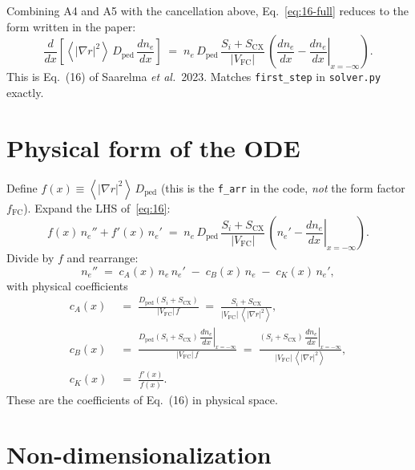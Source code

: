 \documentclass[11pt]{article}
\renewcommand{\ne}{n_{e}}  %
\newcommand{\Vfc}{\lvert V_{\mathrm{FC}}\rvert}
\newcommand{\Si}{S_{i}}
\newcommand{\Scx}{S_{\mathrm{CX}}}
\newcommand{\Dped}{D_{\mathrm{ped}}}
\newcommand{\fFC}{f_{\mathrm{FC}}}
\newcommand{\fsa}[1]{\left\langle #1 \right\rangle}
\newcommand{\gradrsq}{\fsa{|\nabla r|^{2}}}
\newcommand{\neginf}{x=-\infty}
\newcommand{\dneneg}{\left.\dfrac{d\ne}{dx}\right|_{\neginf}}
\begin{document}
Combining A4 and A5 with the cancellation above, Eq.~\eqref{eq:16-full}
reduces to the form written in the paper:
\begin{equation}
  \boxed{\;
    \frac{d}{dx}\!\left[\gradrsq\,\Dped\,\frac{d\ne}{dx}\right]
    \;=\; \ne\,\Dped\,\frac{\Si+\Scx}{\Vfc}\,
          \left(\frac{d\ne}{dx} - \dneneg\right).
  \;}
  \label{eq:16}
\end{equation}
This is Eq.~(16) of Saarelma \emph{et al.}~2023.  Matches
\texttt{first\_step} in \texttt{solver.py} exactly.

\section{Physical form of the ODE}
\label{sec:phys-ode}

Define $f(x)\equiv \gradrsq\,\Dped$ (this is the \texttt{f\_arr} in the
code, \emph{not} the form factor $\fFC$).  Expand the LHS
of~\eqref{eq:16}:
\begin{equation}
  f(x)\,\ne'' + f'(x)\,\ne'
    \;=\; \ne\,\Dped\,\frac{\Si+\Scx}{\Vfc}\,(\ne' - \dneneg).
\end{equation}
Divide by $f$ and rearrange:
\begin{equation}
  \boxed{\;
    \ne'' \;=\; c_A(x)\,\ne\,\ne' \;-\; c_B(x)\,\ne \;-\; c_K(x)\,\ne',
  \;}
  \label{eq:phys-ODE}
\end{equation}
with physical coefficients
\begin{align}
  c_A(x) &\;=\; \frac{\Dped(\Si+\Scx)}{\Vfc\,f}
           \;=\; \frac{\Si+\Scx}{\Vfc\,\gradrsq}, \\
  c_B(x) &\;=\; \frac{\Dped(\Si+\Scx)\,\dneneg}{\Vfc\,f}
           \;=\; \frac{(\Si+\Scx)\,\dneneg}{\Vfc\,\gradrsq}, \\
  c_K(x) &\;=\; \frac{f'(x)}{f(x)}.
\end{align}
These are the coefficients of Eq.~(16) in physical space.

\section{Non-dimensionalization}
\label{sec:nondim}
\end{document}
